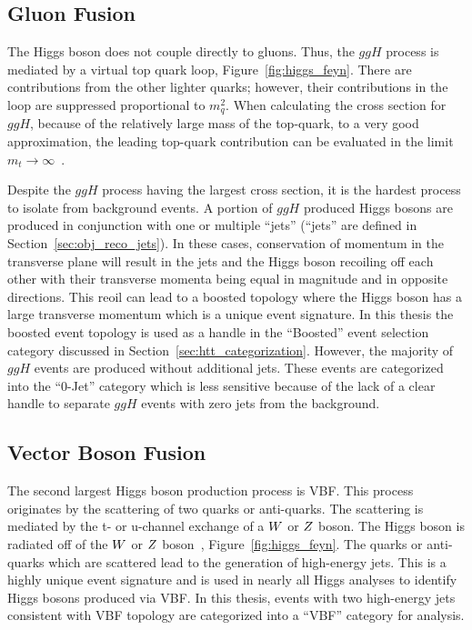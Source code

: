 \subsection{Gluon Fusion}
The Higgs boson does not couple directly to gluons. Thus, the $ggH$ process is mediated by 
a virtual top quark loop, Figure~\ref{fig:higgs_feyn}. There are contributions from the other lighter quarks; however,
their contributions in the loop are suppressed proportional to $m^{2}_{q}$.
When calculating the cross section for $ggH$, because of the relatively large mass of the top-quark, to a very good approximation, 
the leading top-quark contribution can be evaluated in the limit 
$m_{t} \to \infty$~\cite{ELLIS1976292,Shifman:1979eb}.

Despite the $ggH$ process having the largest cross section, it is the hardest process to 
isolate from background events. A portion of $ggH$ produced Higgs bosons are produced
in conjunction with one or multiple ``jets'' (``jets'' are defined in Section~\ref{sec:obj_reco_jets}).
In these cases, conservation of momentum in the transverse plane will result in the jets
and the Higgs boson recoiling off each other with their transverse momenta being
equal in magnitude and in opposite directions. This reoil can lead to a boosted topology
where the Higgs boson has a large transverse momentum
which is a unique event signature. In this thesis the boosted event topology
is used as a handle in the ``Boosted'' event selection category discussed in
Section~\ref{sec:htt_categorization}. However, the majority of $ggH$ events are produced without
additional jets. 
These events are categorized into the ``0-Jet'' category which is less sensitive because of the
lack of a clear handle to separate $ggH$ events with zero jets from the background. 


\subsection{Vector Boson Fusion}
The second largest Higgs boson production process is VBF. This process originates by
the scattering of two quarks or anti-quarks. The scattering is mediated by the t-
or u-channel exchange of a $W$ or $Z$ boson. The Higgs boson is radiated off
of the $W$ or $Z$ boson~\cite{PhysRevD.70.113009}, Figure~\ref{fig:higgs_feyn}. 
The quarks or anti-quarks which are scattered
lead to the generation of high-energy jets.
This is a highly unique event signature and is used in nearly all Higgs analyses
to identify Higgs bosons produced via VBF. In this thesis, events with two high-energy
jets consistent with VBF topology are categorized into a ``VBF'' category for analysis.



